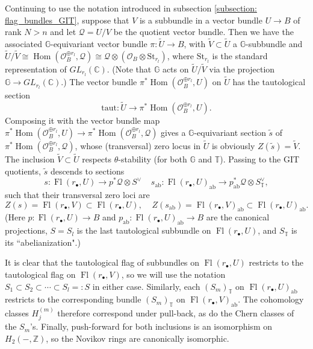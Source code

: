 \documentclass[a4paper,12pt]{amsart}
\numberwithin{equation}{section}
\theoremstyle{definition}
\newcommand{\C}{\mathbb{C}}
\newcommand{\Z}{\mathbb{Z}}
\newcommand{\G}{\mathbb{G}}
\newcommand{\T}{\mathbb{T}}
\newcommand{\cO}{\mathcal{O}}
\newcommand{\Fl}{\operatorname{Fl}}
\newcommand{\Hom}{\operatorname{Hom}}
\begin{document}
Continuing to use the notation introduced in subsection \ref{subsection: flag_bundles_GIT}, suppose that $V$ is a subbundle in a vector bundle $U\to B$ of rank $N>n$ and let $\mathcal{Q}=U/V$ be the quotient vector bundle. Then we have the associated $\G$-equivariant vector bundle $\pi:\widetilde {U}\to B$, with $\widetilde{V}\subset \widetilde{U}$ a $\G$-subbundle and $\widetilde{U}/\widetilde{V}\cong\Hom(\cO_B^{\oplus r_l},\mathcal{Q})\cong\mathcal{Q}\otimes(\mathcal{O}_B\otimes \mathrm{St}_{r_l})$, where $\mathrm{St}_{r_l}$ is the standard representation of $GL_{r_l}(\C)$. (Note that $\G$ acts on $\widetilde{U}/\widetilde{V}$ via the projection $\G\to GL_{r_l}(\C)$.) 
The vector bundle 
$\pi^*\Hom(\cO_B^{\oplus r_l},U)$ on $\widetilde{U}$ has the tautological section $$\mathrm{taut}:\widetilde {U}\to \pi^*\Hom(\cO_B^{\oplus r_l},U).$$ 
Composing it with the vector bundle map $\pi^*\Hom(\cO_B^{\oplus r_l},U)\to \pi^*\Hom(\cO_B^{\oplus r_l},\mathcal{Q})$ gives a $\G$-equivariant section $\tilde{s}$ of $\pi^*\Hom(\cO_B^{\oplus r_l},\mathcal{Q})$, whose (transversal) zero locus in $\widetilde{U}$ is obviously $Z(\tilde{s})=\widetilde{V}$. The inclusion $\widetilde{V}\subset \widetilde{U}$ respects $\theta$-stability (for both $\G$ and $\T$). Passing to the GIT quotients, $\tilde{s}$ descends to sections 
$$s:\Fl(r_\bullet,U)\to p^*\mathcal{Q}\otimes S^\vee\;\;\;\; s_{\mathrm{ab}}:\Fl(r_\bullet,U)_{\mathrm{ab}}\to p_{\mathrm{ab}}^*\mathcal{Q}\otimes S_{\T}^\vee,$$
such that their transversal zero loci are 
$$Z(s)=\Fl(r_\bullet,V)\subset \Fl(r_\bullet,U),\;\;\;\; Z(s_{\mathrm{ab}})=\Fl(r_\bullet,V)_{\mathrm{ab}}\subset \Fl(r_\bullet,U)_{\mathrm{ab}}.$$
(Here $p:\Fl(r_\bullet,U)\to B$ and $p_{\mathrm{ab}}:\Fl(r_\bullet,U)_{\mathrm{ab}}\to B$ are the canonical projections, $S=S_l$ is the last tautological subbundle on $\Fl(r_\bullet,U)$, and $S_\T$ is its ``abelianization".)

It is clear that the tautological flag of subbundles on $\Fl(r_\bullet,U)$ restricts to the tautological flag on $\Fl(r_\bullet,V)$, so we will use the notation $S_1\subset S_2\subset\cdots\subset S_l=:S$ in either case. Similarly, each $(S_m)_\T$ on $\Fl(r_\bullet,U)_{\mathrm{ab}}$ restricts to the corresponding bundle $(S_m)_\T$ on $\Fl(r_\bullet,V)_{\mathrm{ab}}$. The cohomology classes $H_j^{(m)}$ therefore correspond under pull-back, as do the Chern classes of the $S_m$'s. Finally, push-forward for both inclusions is an isomorphism on $H_2(-,\Z)$, so the Novikov rings are canonically isomorphic.
\end{document}
